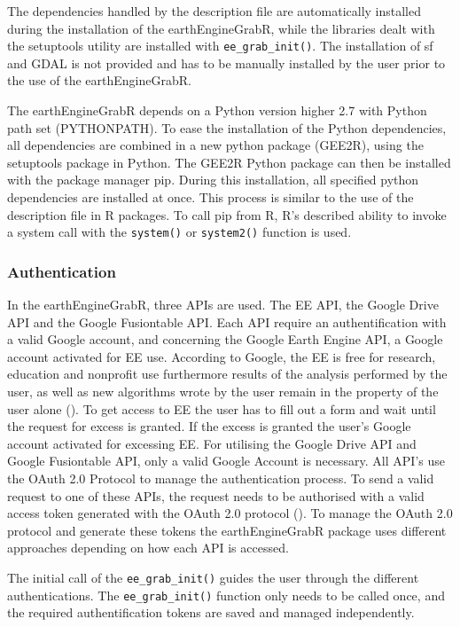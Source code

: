 The dependencies handled by the description file are automatically installed during the installation of the earthEngineGrabR, while the libraries dealt with the setuptools utility are installed with \texttt{ee\_grab\_init()}. The installation of sf and GDAL is not provided and has to be manually installed by the user prior to the use of the earthEngineGrabR.

The earthEngineGrabR depends on a Python version higher 2.7 with Python path set (PYTHONPATH). To ease the installation of the Python dependencies, all dependencies are combined in a new python package (GEE2R), using the setuptools package in Python. The GEE2R Python package can then be installed with the package manager pip. During this installation, all specified python dependencies are installed at once. This process is similar to the use of the description file in R packages. To call pip from R, R's described ability to invoke a system call with the \texttt{system()} or \texttt{system2()} function is used.

\subsubsection{Authentication}

In the earthEngineGrabR, three APIs are used. The EE API, the Google Drive API and the Google Fusiontable API. Each API require an authentification with a valid Google account, and concerning the Google Earth Engine API, a Google account activated for EE use. According to Google, the EE is free for research, education and nonprofit use furthermore results of the analysis performed by the user, as well as new algorithms wrote by the user remain in the property of the user alone (\cite{terms}).
To get access to EE the user has to fill out a form and wait until the request for excess is granted. If the excess is granted the user's Google account activated for excessing EE. For utilising the Google Drive API and Google Fusiontable API, only a valid Google Account is necessary. All API's use the OAuth 2.0 Protocol to manage the authentication process. To send a valid request to one of these APIs, the request needs to be authorised with a valid access token generated with the OAuth 2.0 protocol (\cite{hardt2012oauth}). To manage the OAuth 2.0 protocol and generate these tokens the earthEngineGrabR package uses different approaches depending on how each API is accessed. 

The initial call of the \texttt{ee\_grab\_init()} guides the user through the different authentications. The \texttt{ee\_grab\_init()} function only needs to be called once, and the required authentification tokens are saved and managed independently. 





